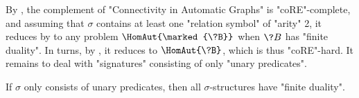 By , the complement of "Connectivity in Automatic Graphs"
is "coRE"-complete, and assuming that $\sigma$ contains at least one "relation symbol" of "arity" 2,
it reduces by  to any problem $\HomAut{\marked{\?B}}$ when $\?B$ has "finite duality". In turns, by , it reduces to
$\HomAut{\?B}$, which is thus "coRE"-hard. It remains to deal with "signatures" consisting of only
"unary predicates".

\begin{property}
	\AP\label{prop:finite-duality-unary-predicates}
	If $\sigma$ only consists of unary predicates, then all $\sigma$-structures
	have "finite duality".
\end{property}	

